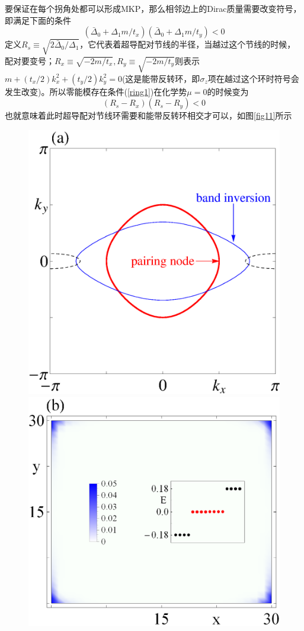 \qquad 要保证在每个拐角处都可以形成MKP，那么相邻边上的Dirac质量需要改变符号，即满足下面的条件
\begin{equation}
(\bar{\Delta}_0+\Delta_1m/t_x)(\bar{\Delta}_0+\Delta_1m/t_y)<0\label{ring1}
\end{equation}
定义$R_s\equiv\sqrt{2\bar{\Delta}_0/\Delta_1}$，它代表着超导配对节线的半径，当越过这个节线的时候，配对要变号；$R_x\equiv\sqrt{-2m/t_x},R_y\equiv\sqrt{-2m/t_y}$则表示$m+(t_x/2)k_x^2+(t_y/2)k_y^2=0$(这是能带反转环，即$\sigma_z$项在越过这个环时符号会发生改变)。所以零能模存在条件(\ref{ring1})在化学势$\mu=0$的时候变为
\begin{equation}
(R_s-R_x)(R_s-R_y)<0
\end{equation}
也就意味着此时超导配对节线环需要和能带反转环相交才可以，如图\ref{fig11}所示
\begin{figure}
\centering
\includegraphics[scale=0.45]{pic/fig12a}
\includegraphics[scale=0.45]{pic/fig12b}

\end{figure}
